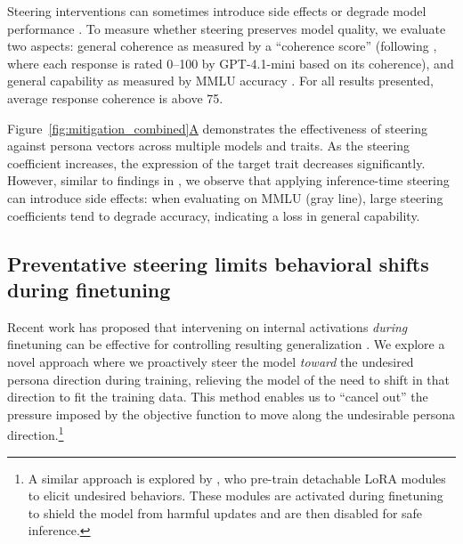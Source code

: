Steering interventions can sometimes introduce side effects or degrade model performance \citep{durmus2024steering}.
To measure whether steering preserves model quality, we evaluate two aspects: general coherence as measured by a ``coherence score'' (following \citet{betley2025emergentmisalignmentnarrowfinetuning}, where each response is rated 0--100 by GPT-4.1-mini based on its coherence), and general capability as measured by MMLU accuracy \citep{hendrycks2021measuringmassivemultitasklanguage}.
For all results presented, average response coherence is above 75.

Figure~\hyperref[fig:mitigation_combined]{\ref*{fig:mitigation_combined}A} demonstrates the effectiveness of steering against persona vectors across multiple models and traits.
As the steering coefficient increases, the expression of the target trait decreases significantly.
However, similar to findings in \citet{durmus2024steering}, we observe that applying inference-time steering can introduce side effects: when evaluating on MMLU (gray line),
large steering coefficients tend to degrade accuracy, indicating a loss in general capability.

\subsection{Preventative steering limits behavioral shifts during finetuning}

Recent work has proposed that intervening on internal activations \emph{during} finetuning can be effective for controlling resulting generalization \citep{casademunt2025steering}.
We explore a novel approach where we proactively steer the model \emph{toward} the undesired persona direction during training, relieving the model of the need to shift in that direction to fit the training data.
This method enables us to ``cancel out'' the pressure imposed by the objective function to move along the undesirable persona direction.\footnote{A similar approach is explored by \citet{zhou2023making}, who pre-train detachable LoRA modules to elicit undesired behaviors. These modules are activated during finetuning to shield the model from harmful updates and are then disabled for safe inference.}

